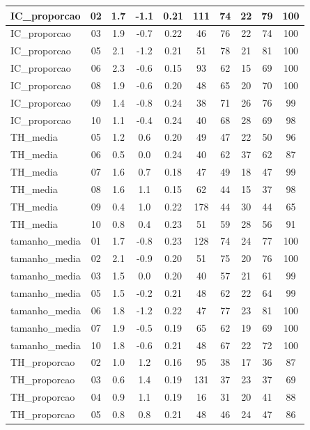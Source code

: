 \documentclass[a4paper]{report}
\begin{document}
\begin{longtable}{l|c|c|c|c|c|c|c|c|c}
\hline
IC\_proporcao & 02 & 1.7 & -1.1 & 0.21 & 111 & 74 & 22 & 79 & 100\\
\hline
IC\_proporcao & 03 & 1.9 & -0.7 & 0.22 & 46 & 76 & 22 & 74 & 100\\
\hline
IC\_proporcao & 05 & 2.1 & -1.2 & 0.21 & 51 & 78 & 21 & 81 & 100\\
\hline
IC\_proporcao & 06 & 2.3 & -0.6 & 0.15 & 93 & 62 & 15 & 69 & 100\\
\hline
IC\_proporcao & 08 & 1.9 & -0.6 & 0.20 & 48 & 65 & 20 & 70 & 100\\
\hline
IC\_proporcao & 09 & 1.4 & -0.8 & 0.24 & 38 & 71 & 26 & 76 & 99\\
\hline
IC\_proporcao & 10 & 1.1 & -0.4 & 0.24 & 40 & 68 & 28 & 69 & 98\\
\hline
TH\_media & 05 & 1.2 & 0.6 & 0.20 & 49 & 47 & 22 & 50 & 96\\
\hline
TH\_media & 06 & 0.5 & 0.0 & 0.24 & 40 & 62 & 37 & 62 & 87\\
\hline
TH\_media & 07 & 1.6 & 0.7 & 0.18 & 47 & 49 & 18 & 47 & 99\\
\hline
TH\_media & 08 & 1.6 & 1.1 & 0.15 & 62 & 44 & 15 & 37 & 98\\
\hline
TH\_media & 09 & 0.4 & 1.0 & 0.22 & 178 & 44 & 30 & 44 & 65\\
\hline
TH\_media & 10 & 0.8 & 0.4 & 0.23 & 51 & 59 & 28 & 56 & 91\\
\hline
tamanho\_media & 01 & 1.7 & -0.8 & 0.23 & 128 & 74 & 24 & 77 & 100\\
\hline
tamanho\_media & 02 & 2.1 & -0.9 & 0.20 & 51 & 75 & 20 & 76 & 100\\
\hline
tamanho\_media & 03 & 1.5 & 0.0 & 0.20 & 40 & 57 & 21 & 61 & 99\\
\hline
tamanho\_media & 05 & 1.5 & -0.2 & 0.21 & 48 & 62 & 22 & 64 & 99\\
\hline
tamanho\_media & 06 & 1.8 & -1.2 & 0.22 & 47 & 77 & 23 & 81 & 100\\
\hline
tamanho\_media & 07 & 1.9 & -0.5 & 0.19 & 65 & 62 & 19 & 69 & 100\\
\hline
tamanho\_media & 10 & 1.8 & -0.6 & 0.21 & 48 & 67 & 22 & 72 & 100\\
\hline
TH\_proporcao & 02 & 1.0 & 1.2 & 0.16 & 95 & 38 & 17 & 36 & 87\\
\hline
TH\_proporcao & 03 & 0.6 & 1.4 & 0.19 & 131 & 37 & 23 & 37 & 69\\
\hline
TH\_proporcao & 04 & 0.9 & 1.1 & 0.19 & 16 & 31 & 20 & 41 & 88\\
\hline
TH\_proporcao & 05 & 0.8 & 0.8 & 0.21 & 48 & 46 & 24 & 47 & 86\\

\end{longtable}
\end{document}
